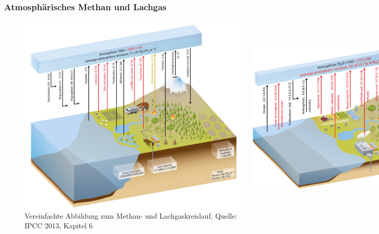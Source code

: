\begin{frame}
	\frametitle{Atmosphärisches Methan und Lachgas}
	\begin{figure}
		\begin{columns}
				\includegraphics[width=\linewidth]{bilder/IPCC_Cycles_methane.jpg}

				\includegraphics[width=\linewidth]{bilder/IPCC_Cycles_n2o_new.jpg}
		\end{columns}
		\caption{Vereinfachte Abbildung zum Methan- und Lachgaskreislauf, Quelle: IPCC 2013, Kapitel 6}
	\end{figure}


\end{frame}
